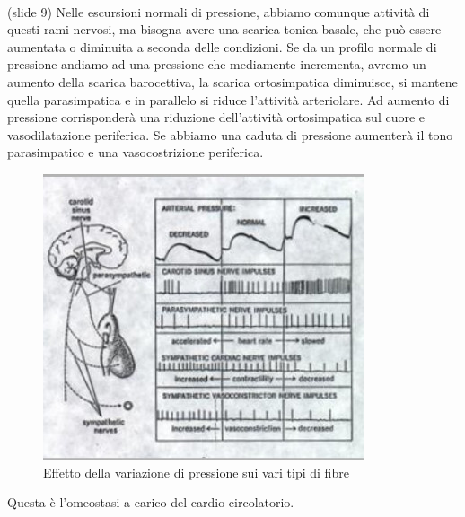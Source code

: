\documentclass[a4paper,12pt]{article}
\begin{document}
\paragraph{}
(slide 9) Nelle escursioni normali di pressione, abbiamo comunque attività di questi rami nervosi, ma bisogna avere una scarica tonica basale, che può essere aumentata o diminuita a seconda delle condizioni. Se da un profilo normale di pressione andiamo ad una pressione che mediamente incrementa, avremo un aumento della scarica barocettiva, la scarica ortosimpatica diminuisce, si mantene quella parasimpatica e in parallelo si riduce l'attività arteriolare. Ad aumento di pressione corrisponderà una riduzione dell'attività ortosimpatica sul cuore e vasodilatazione periferica. Se abbiamo una caduta di pressione aumenterà il tono parasimpatico e una vasocostrizione periferica.
\begin{figure}[H]
\centering
\includegraphics[scale=0.45]{immagine/scarica.jpg}
\caption{Effetto della variazione di pressione sui vari tipi di fibre}
\end{figure}
 Questa è l'omeostasi a carico del cardio-circolatorio. 
\end{document}
